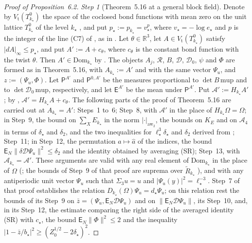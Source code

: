 \documentclass[11pt]{amsart}
\theoremstyle{definition}
\begin{document}
\begin{proof}[Proof of Proposition~6.2]
\emph{Step 1} (Theorem~5.16 at a general block field).
Denote by $V_{\mathrm t}(T^0_{k_\star})$ the space of the coclosed bond functions with mean zero on the unit lattice $T^0_{k_\star}$ of the level $k_\star$ \cite[Section~G4.0.6]{QEDIII}, and put $p_\star:=p_{k_\star}=v_\star^{p}$, where $v_\star=-\log e_\star$ and $p$ is the integer of the line (C7) of \cite[Section~I.8.2]{QEDIII}, as in \cite[Section~I.6.1]{QEDIII}.
Let $\theta\in\mathbb R^3$, let $A\in V_{\mathrm t}(T^0_{k_\star})$ satisfy $|dA|_\infty\le p_\star$, and put $A':=A+c_\theta$, where $c_\theta$ is the constant bond function with the twist $\theta$.
Then $A'\in\mathrm{Dom}_{k_\star}$ by \cite[Proposition~32.1]{QEDIII}.
The objects $A_j$, $\mathcal R$, $B$, $\mathcal D$, $\mathcal D_0$, $\psi$ and $\Phi$ are formed as in Theorem~5.16, with $A_{k_\star}:=A'$ and with the same vector $\Psi_u$, and $z:=(\Psi_u,\Phi)$.
Let $\mathsf P^{A'}$ and $\mathsf P^{0,A'}$ be the measures proportional to $\det B\,\mathrm{mup}$ and to $\det\mathcal D_0\,\mathrm{mup}$, respectively, and let $\mathsf E^{A'}$ be the mean under $\mathsf P^{A'}$.
Put $\mathscr A':=H_{k_\star}A'$;
by \cite[Proposition~5.31]{QEDI}, $\mathscr A'=H_{k_\star}A+c_\theta$.
The following parts of the proof of Theorem~5.16 are carried out at $A_{k_\star}=A'$:
Steps~1 to~6;
Step~8, with $\mathscr A'$ in the place of $H_{k_\star}\Omega=\Omega$;
in Step~9, the bound on $\sum_XE_{k_\star}$ in the norm $|\cdot|_{\mathrm{aw}_2}$, the bounds on $K_E$ and on $\mathcal A_4$ in terms of $\delta_\star$ and $\delta_2$, and the two inequalities for $\ell_\star^3\delta_\star$ and $\delta_2$ derived from \cite[(T2)]{QEDIII};
Step~11;
in Step~12, the permutation $a\mapsto\hat a$ of the indices, the bound $\mathsf E_N\|\delta\mathcal D\Psi_u\|^2\le\delta_2$ and the identity obtained by averaging (SR);
Step~13, with $\mathscr A_{k_\star}=\mathscr A'$.
These arguments are valid with any real element of $\mathrm{Dom}_{k_\star}$ in the place of $\Omega$ (\cite[Chapter~29, Lemma~2\,(t4)]{QEDIII}; the bounds of Step~9 of that proof are suprema over $\tilde R_{k_\star}$ \cite[Proposition~20.1\,(c)]{QEDIII}), and with any antiperiodic unit vector $\Psi_u$ such that $\Sigma_3u=u$ and $|\Psi_u(y)|^2=\ell_\star^{-3}$.
Step~7 of that proof establishes the relation $D_{k_\star}(\Omega)\Psi_u=d_\star\Psi_u$;
on this relation rest the bounds of its Step~9 on $\bar z=(\Psi_u,\mathsf E_N\mathcal D\Psi_u)$ and on $\|\mathsf E_N\mathcal D\Psi_u\|$, its Step~10, and, in its Step~12, the estimate comparing the right side of the averaged identity (SR) with $c_\star$, the bound $\mathsf E_N\|\Phi\|^2\le2$ and the inequality $|1-\bar z/b_\star|^2\ge(Z_0^{1/2}-2\delta_\star)^2$.

\end{proof}
\end{document}

